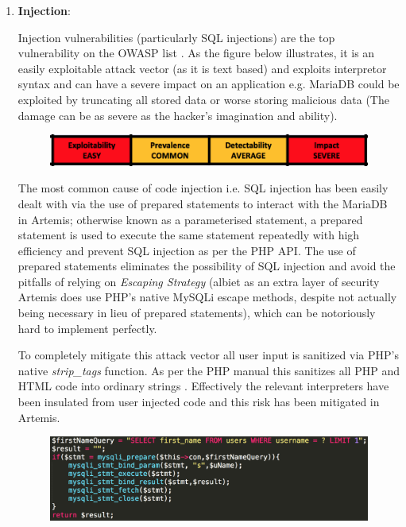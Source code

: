 \begin{enumerate}
    \item \textbf{Injection}:
    
    Injection vulnerabilities (particularly SQL injections) are the top vulnerability on the OWASP list \cite{OWASP2017}. As the figure below illustrates, it is an easily exploitable attack vector (as it is text based) and exploits interpretor syntax and can have a severe impact on an application e.g. MariaDB could be exploited by truncating all stored data or worse storing malicious data (The damage can be as severe as the hacker's imagination and ability).
    
    \begin{figure}[H]
    	\centering
    	\includegraphics[scale=0.80]{figures/injection}
    	\label{injection}
    \end{figure}
    
    The most common cause of code injection i.e. SQL injection has been easily dealt with via the use of prepared statements to interact with the MariaDB in Artemis; otherwise known as a parameterised statement, a prepared statement is used to execute the same statement repeatedly with high efficiency and prevent SQL injection as per the PHP API\cite{PHP}. The use of prepared statements eliminates the possibility of SQL injection and avoid the pitfalls of relying on \textit{Escaping Strategy} (albiet as an extra layer of security Artemis does use PHP's native MySQLi escape methods, despite not actually being necessary in lieu of prepared statements), which can be notoriously hard to implement perfectly.
    
    To completely mitigate this attack vector all user input is  sanitized via PHP's native \textit{strip\_tags} function. As per the PHP manual this sanitizes all PHP and HTML code into ordinary strings . Effectively the relevant interpreters have been insulated from user injected code and this risk has been mitigated in Artemis.
    
    \begin{figure}[h]
    	\centering
    	\includegraphics[scale=0.61,right]{chapters/chapter03/figures/preparedStmt.png}
    	\label{Example Prepared Statement}
    \end{figure}
    


\end{enumerate}
